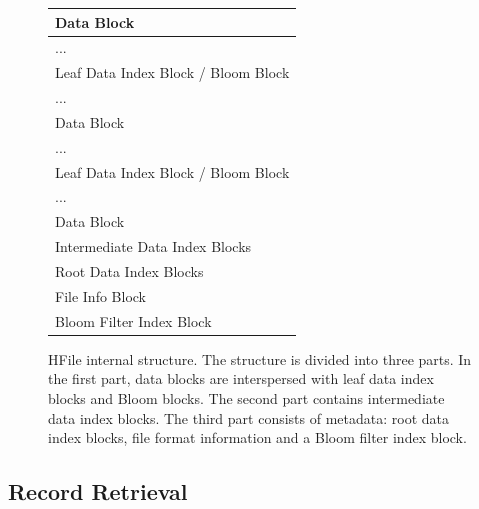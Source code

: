 \begin{figure}
  \begin{center}
    \begin{tabular}{|l|}
      \hline
      \rowcolor[gray]{0.85}
      Data Block \\
      \hline
      \rowcolor[gray]{0.85}
      ... \\
      \hline
      \rowcolor[gray]{0.95}
      Leaf Data Index Block / Bloom Block \\
      \hline
      \rowcolor[gray]{0.85}
      ... \\
      \hline
      \rowcolor[gray]{0.85}
      Data Block \\
      \hline
      \rowcolor[gray]{0.85}
      ... \\
      \hline
      \rowcolor[gray]{0.95}
      Leaf Data Index Block / Bloom Block \\
      \hline
      \rowcolor[gray]{0.85}
      ... \\
      \hline
      \rowcolor[gray]{0.85}
      Data Block \\
      \hline
      \hline
      \rowcolor[gray]{0.9}
      Intermediate Data Index Blocks \\
      \hline
      \hline
      \rowcolor[gray]{0.7}
      Root Data Index Blocks \\
      \hline
      \rowcolor[gray]{0.7}
      File Info Block \\
      \hline
      \rowcolor[gray]{0.7}
      Bloom Filter Index Block \\
      \hline
    \end{tabular}
    \caption[Caption for LOF]{HFile internal structure.\footnotemark
    The structure is divided into three parts. In the first part, data blocks
    are interspersed with leaf data index blocks and Bloom blocks. The second
    part contains intermediate data index blocks. The third part consists
    of metadata: root data index blocks, file format information and a Bloom
    filter index block.}
    \label{fig:hfile}
  \end{center}
\end{figure}


\subsection{Record Retrieval}
\label{sec:recordRetrieval}

